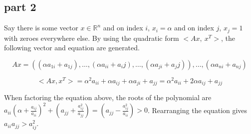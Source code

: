 \documentclass{report}
\begin{document}
\subsection*{part 2}
Say there is some vector $x\in\mathbb{R}^n$ and on index $i$, $x_i=\alpha$ and on index $j$, $x_j=1$ with zeroes everywhere else.
By using the quadratic form $<Ax, \ x^T>$, the following vector and equation are generated.

$$Ax = ((\alpha a_{1i} + a_{1j}), \dots ,(\alpha a_{ii} + a_ij), \dots, (\alpha a_{ji} + a_jj)), \dots, (\alpha a_{ni}+a_{nj})$$

$$<Ax, x^T> = \alpha^2 a_{ii} + \alpha a_{ij} + \alpha a_{ji} + a_{jj} = \alpha^2 a_{ii} + 2\alpha a_{ij} + a_{jj}$$

\noindent When factoring the equation above, the roots of the polynomial are $a_{ii}(\alpha+\frac{a_{ij}}{a_{ii}})^2+(a_{jj}+\frac{a_{ij}^2}{a_{jj}})=(a_{jj}-\frac{a_{ij}^2}{a_{ii}}) > 0$.
Rearranging the equation gives $a_{ii}a_{jj} > a_{ij}^2$.
\end{document}

